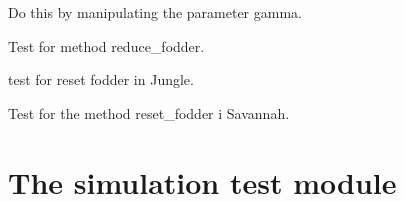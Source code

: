 \documentclass[a4paper,10pt,english]{sphinxmanual}
\begin{document}
\begin{fulllineitems}
\begin{fulllineitems}
Do this by manipulating the parameter gamma.

\end{fulllineitems}


\begin{fulllineitems}
\label{\detokenize{tests:biosim.tests.test_landscape.TestLandscape.test_reduce_fodder}}
Test for method reduce\_fodder.

\end{fulllineitems}


\begin{fulllineitems}
\label{\detokenize{tests:biosim.tests.test_landscape.TestLandscape.test_reset_fodder_jungle}}
test for reset fodder in Jungle.

\end{fulllineitems}


\begin{fulllineitems}
\label{\detokenize{tests:biosim.tests.test_landscape.TestLandscape.test_reset_fodder_savannah}}
Test for the method reset\_fodder i Savannah.

\end{fulllineitems}


\end{fulllineitems}



\section{The simulation test module}
\label{\detokenize{tests:the-simulation-test-module}}\label{\detokenize{tests:module-biosim.tests.test_simulation}}
\end{document}
